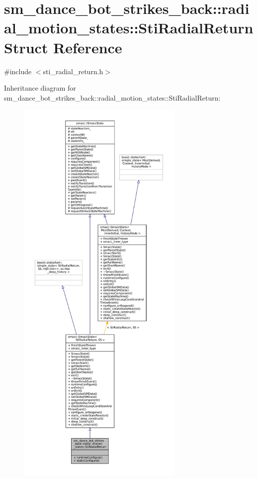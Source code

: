 \hypertarget{structsm__dance__bot__strikes__back_1_1radial__motion__states_1_1StiRadialReturn}{}\section{sm\+\_\+dance\+\_\+bot\+\_\+strikes\+\_\+back\+:\+:radial\+\_\+motion\+\_\+states\+:\+:Sti\+Radial\+Return Struct Reference}
\label{structsm__dance__bot__strikes__back_1_1radial__motion__states_1_1StiRadialReturn}


{\ttfamily \#include $<$sti\+\_\+radial\+\_\+return.\+h$>$}



Inheritance diagram for sm\+\_\+dance\+\_\+bot\+\_\+strikes\+\_\+back\+:\+:radial\+\_\+motion\+\_\+states\+:\+:Sti\+Radial\+Return\+:
\nopagebreak
\begin{figure}[H]
\begin{center}
\leavevmode
\includegraphics[height=550pt]{structsm__dance__bot__strikes__back_1_1radial__motion__states_1_1StiRadialReturn__inherit__graph}
\end{center}
\end{figure}


